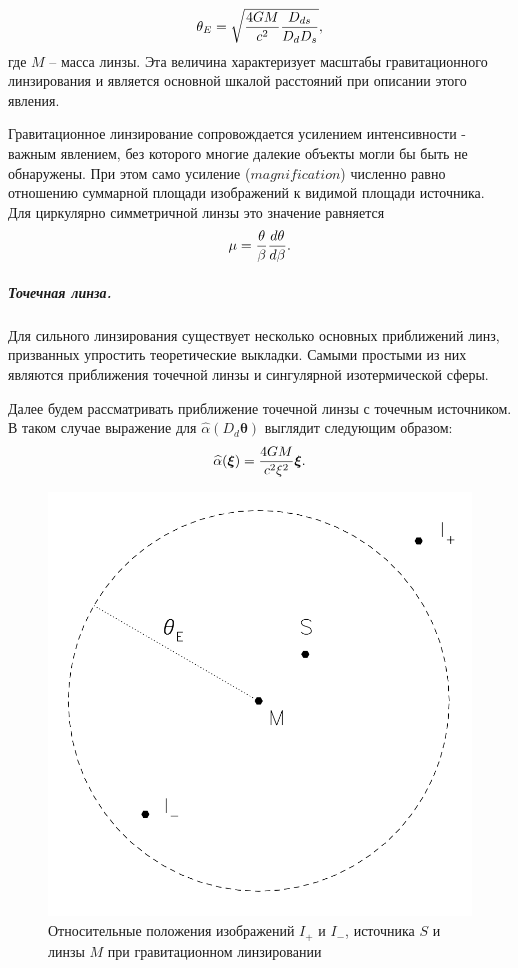 \documentclass[12pt,a4paper]{article}
\begin{document}
\begin{equation}
    \theta_E = \sqrt{{4 G  M \over c^2  } {D_{ds} \over D_d D_{s}}},
\end{equation}
где $M$ -- масса линзы. Эта величина характеризует масштабы гравитационного линзирования и является основной шкалой расстояний при описании этого явления.

Гравитационное линзирование сопровождается усилением интенсивности - важным явлением, без которого многие далекие объекты могли бы быть не обнаружены.
При этом само усиление ($magnification$) численно равно отношению суммарной площади изображений к видимой площади источника.
Для циркулярно симметричной линзы это значение равняется
\begin{equation}
    \mu = {\theta \over \beta}{ d\theta \over d\beta}.
\end{equation}

\subparagraph*{Точечная линза.}
Для сильного линзирования существует несколько основных приближений линз, призванных упростить теоретические выкладки.
Самыми простыми из них являются приближения точечной линзы и сингулярной изотермической сферы.

Далее будем рассматривать приближение точечной линзы с точечным источником.
В таком случае выражение для $\widehat{\alpha}(D_d \bm \theta)$ выглядит следующим образом:
\begin{equation}
    \widehat{\alpha}(\bm \xi) = {4 G M \over c^2 \xi^2} \bm \xi.
\end{equation}

\begin{figure}
    \centering
    \includegraphics[width=0.8\linewidth]{sources/imagesForm.png}
    \caption{\small Относительные положения изображений $I_+$ и $I_-$, источника $S$ и линзы $M$ при гравитационном линзировании}   
\end{figure}
\end{document}
